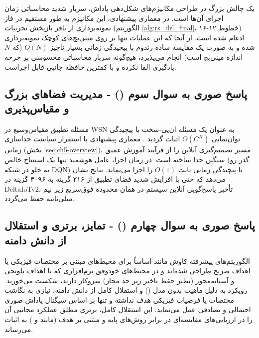 \documentclass[oneside,openany,phd]{TMU-Thesis}
\begin{document}
یک چالش بزرگ در طراحی مکانیزم‌های شکل‌دهی پاداش، سربار شدید محاسباتی زمان اجرای آن‌ها است. در معماری پیشنهادی، این مکانیزم به طور مستقیم در فاز نمونه‌برداری از بافر بازپخش تجربیات (الگوریتم \ref{alg:rs_drl_final}، خطوط ۱۲-۱۶) ادغام شده است. از آنجا که این عملیات تنها بر روی مینی‌بچ‌های کوچک نمونه‌برداری شده و به صورت یک مقایسه ساده رندوم با پیچیدگی زمانی بسیار ناچیز $O(N)$ (که $N$ اندازه مینی‌بچ است) انجام می‌پذیرد، هیچ‌گونه سربار محاسباتی محسوسی بر چرخه یادگیری القا نکرده و با کمترین حافظه جانبی قابل اجراست.



\subsection{پاسخ صوری به سوال سوم () - مدیریت فضاهای بزرگ و مقیاس‌پذیری}

\label{subsec:rq3_ans}

مسئله تطبیق مقیاس‌وسیع در WSN به عنوان یک مسئله ان‌پی-سخت با پیچیدگی توان‌نمایی $O(C^K)$ اثبات گردید \cite{garey1979computers}. معماری پیشنهادی با استقرار سیاست جداسازی زمانی (بخش \ref{sec:ch5-overview})، مسیر تصمیم‌گیری آنلاین را از فرآیند آموزش عمیق سنگین جدا ساخته است. در زمان اجرا، عامل هوشمند تنها یک استنتاج خالص (گذر رو به جلو در شبکه DQN) با پیچیدگی زمانی ثابت $O(1)$ را اجرا می‌نماید. نتایج نشان می‌دهد که حتی با افزایش شدید فضای تطبیق از ۲۱۶ گزینه به ۴۰۹۶ گزینه در DeltaIoTv2، تأخیر پاسخ‌گویی آنلاین سیستم در همان محدوده فوق‌سریع زیر نیم میلی‌ثانیه حفظ می‌گردد.



\subsection{پاسخ صوری به سوال چهارم () - تمایز، برتری و استقلال از دانش دامنه}

\label{subsec:rq4_ans}

الگوریتم‌های پیشرفته کاوش مانند  \cite{andrychowicz2017her} اساساً برای محیط‌های مبتنی بر مختصات فیزیکی یا اهداف صریح طراحی شده‌اند و در محیط‌های خودوفق نرم‌افزاری که با اهداف تلویحی و آستانه‌محور (نظیر حفظ تاخیر زیر حد مجاز) سروکار دارند، شکست می‌خورند. رویکرد  به دلیل ماهیت بدون مدل () \cite{sutton2018reinforcement} و استقلال کامل از دانش دامنه، نیازی به نگاشت مختصات یا فرضیات فیزیکی هدف نداشته و تنها بر اساس سیگنال پاداش صوری احتمالی و تصادفی عمل می‌نماید. این استقلال کامل، برتری مطلق عملکرد مجانبی آن را در ارزیابی‌های مقایسه‌ای در برابر روش‌های پایه و مبتنی بر هدف (مانند  \cite{he2020softher} و  \cite{weyns2022deep}) به اثبات می‌رساند.
\end{document}
